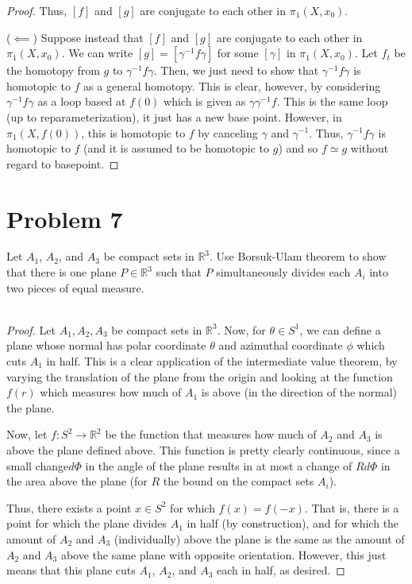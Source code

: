 \documentclass[fontsize=11pt]{scrartcl} %
\numberwithin{equation}{section} %
\numberwithin{figure}{section} %
\numberwithin{table}{section} %
\newcommand{\R}{\mathbb{R}}
\begin{document}
\begin{proof}
    Thus, $[f]$ and $[g]$ are conjugate to each other in $\pi_1(X,x_0)$.

    ($\impliedby$)
    Suppose instead that $[f]$ and $[g]$ are conjugate to each other in
    $\pi_1(X,x_0)$. We can write $[g] = [\gamma^{-1}f\gamma]$ for some
    $[\gamma]$ in $\pi_1(X,x_0)$. Let $f_t$ be the homotopy from $g$ to
    $\gamma^{-1} f\gamma$. Then, we just need to show that $\gamma^{-1}f\gamma$
    is homotopic to $f$ as a general homotopy. This is clear, however, by
    considering $\gamma^{-1}f\gamma$ as a loop based at $f(0)$ which is given as
    $\gamma\gamma^{-1}f$. This is the same loop (up to reparameterization), it
    just has a new base point. However, in $\pi_1(X,f(0))$, this is homotopic to
    $f$ by canceling $\gamma$ and $\gamma^{-1}$. Thus, $\gamma^{-1}f\gamma$ is
    homotopic to $f$ (and it is assumed to be homotopic to $g$) and so $f\simeq
    g$ without regard to basepoint.
\end{proof}

\newpage

\section*{Problem 7} %
Let $A_1$, $A_2$, and $A_3$ be compact sets in $\R^3$. Use Borsuk-Ulam theorem
to show that there is one plane $P\in \R^3$ such that $P$ simultaneously divides
each $A_i$ into two pieces of equal measure.
\\
\\
\begin{proof}
    Let $A_1,A_2, A_3$ be compact sets in $\R^3$. Now, for $\theta\in S^1$, we
    can define a plane whose normal has polar coordinate $\theta$ and azimuthal
    coordinate $\phi$ which cuts $A_1$ in half. This is a clear application of
    the intermediate value theorem, by varying the translation of the plane from
    the origin and looking at the function $f(r)$ which measures how much of
    $A_1$ is above (in the direction of the normal) the plane.

    Now, let $f:S^2\to\R^2$ be the function that measures how much of $A_2$ and
    $A_3$ is above the plane defined above. This function is pretty clearly
    continuous, since a small change$d\Phi$ in the angle of the plane results in
    at most a change of $Rd\Phi$ in the area above the plane (for $R$ the bound
    on the compact sets $A_i$).

    Thus, there exists a point $x\in S^2$ for which $f(x) = f(-x)$. That is,
    there is a point for which the plane divides $A_1$ in half (by
    construction), and for which the amount of $A_2$ and $A_3$ (individually)
    above the plane is the same as the amount of $A_2$ and $A_3$ above the
    same plane with opposite orientation. However, this just means that this
    plane cuts $A_1$, $A_2$, and $A_3$ each in half, as desired.
\end{proof}
\end{document}

